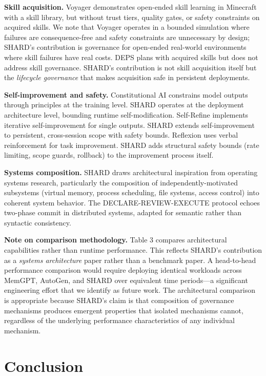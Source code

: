 \documentclass[11pt]{article}
\begin{document}
\textbf{Skill acquisition.} Voyager \citep{wang2023voyager} demonstrates open-ended skill learning in Minecraft with a skill library, but without trust tiers, quality gates, or safety constraints on acquired skills. We note that Voyager operates in a bounded simulation where failures are consequence-free and safety constraints are unnecessary by design; SHARD's contribution is governance for open-ended real-world environments where skill failures have real costs. DEPS \citep{wang2023deps} plans with acquired skills but does not address skill governance. SHARD's contribution is not skill acquisition itself but the \emph{lifecycle governance} that makes acquisition safe in persistent deployments.

\textbf{Self-improvement and safety.} Constitutional AI \citep{bai2022constitutional} constrains model outputs through principles at the training level. SHARD operates at the deployment architecture level, bounding runtime self-modification. Self-Refine \citep{madaan2023selfrefine} implements iterative self-improvement for single outputs. SHARD extends self-improvement to persistent, cross-session scope with safety bounds. Reflexion \citep{shinn2023reflexion} uses verbal reinforcement for task improvement. SHARD adds structural safety bounds (rate limiting, scope guards, rollback) to the improvement process itself.

\textbf{Systems composition.} SHARD draws architectural inspiration from operating systems research, particularly the composition of independently-motivated subsystems (virtual memory, process scheduling, file systems, access control) into coherent system behavior. The DECLARE-REVIEW-EXECUTE protocol echoes two-phase commit in distributed systems, adapted for semantic rather than syntactic consistency.

\textbf{Note on comparison methodology.} Table 3 compares architectural capabilities rather than runtime performance. This reflects SHARD's contribution as a \emph{systems architecture} paper rather than a benchmark paper. A head-to-head performance comparison would require deploying identical workloads across MemGPT, AutoGen, and SHARD over equivalent time periods---a significant engineering effort that we identify as future work. The architectural comparison is appropriate because SHARD's claim is that composition of governance mechanisms produces emergent properties that isolated mechanisms cannot, regardless of the underlying performance characteristics of any individual mechanism.

\section{Conclusion}
\end{document}
